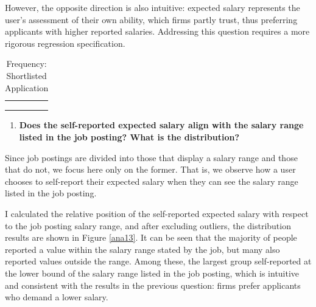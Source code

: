 \documentclass[12pt]{article}
\begin{document}
However, the opposite direction is also intuitive: expected salary represents the user's assessment of their own ability, which firms partly trust, thus preferring applicants with higher reported salaries. Addressing this question requires a more rigorous regression specification.



\begin{table}[]
    \centering
    \caption{Frequency: Shortlisted Application}
    \begin{tabular}{cccc}
\hline
\hline
\vspace{-0.4cm}
\\
 \\
\vspace{-1cm} \\
\hline 
\hline
    \end{tabular}
\label{ana11}
\end{table}



\begin{table}[]
    \centering
        \caption{Regression: Shortlisted \& Expected Salary}

    \label{ana12}
\end{table}












\begin{enumerate}[resume]
    \item \textbf{Does the self-reported expected salary align with the salary range listed in the job posting? What is the distribution?}
\end{enumerate}

Since job postings are divided into those that display a salary range and those that do not, we focus here only on the former. That is, we observe how a user chooses to self-report their expected salary when they can see the salary range listed in the job posting. 

I calculated the relative position of the self-reported expected salary with respect to the job posting salary range, and after excluding outliers, the distribution results are shown in Figure \ref{ana13}. It can be seen that the majority of people reported a value within the salary range stated by the job, but many also reported values outside the range. Among these, the largest group self-reported at the lower bound of the salary range listed in the job posting, which is intuitive and consistent with the results in the previous question: firms prefer applicants who demand a lower salary.
\end{document}
